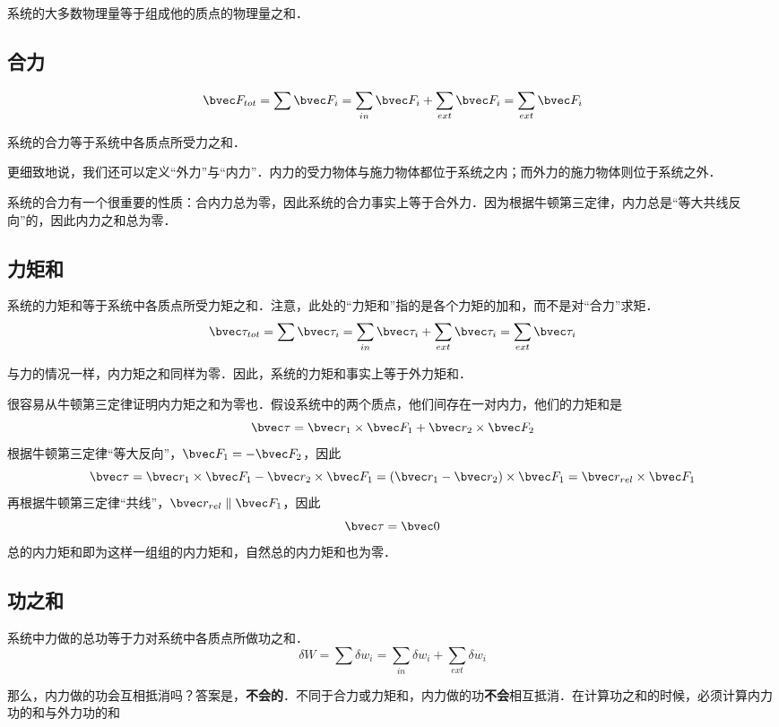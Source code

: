 

系统的大多数物理量等于组成他的质点的物理量之和．
\subsection{合力}
\begin{equation}
\bvec F_{tot}=\sum \bvec F_i=\sum_{in} \bvec F_i + \sum_{ext} \bvec F_i = \sum_{ext} \bvec F_i
\end{equation}

系统的合力等于系统中各质点所受力之和．

更细致地说，我们还可以定义“外力”与“内力”．内力的受力物体与施力物体都位于系统之内；而外力的施力物体则位于系统之外．

系统的合力有一个很重要的性质：合内力总为零，因此系统的合力事实上等于合外力．因为根据牛顿第三定律，内力总是“等大共线反向”的，因此内力之和总为零．

\subsection{力矩和}
系统的力矩和等于系统中各质点所受力矩之和．注意，此处的“力矩和”指的是各个力矩的加和，而不是对“合力”求矩．
\begin{equation}
\bvec \tau_{tot}=\sum \bvec \tau_i=\sum_{in} \bvec \tau_i + \sum_{ext} \bvec \tau_i = \sum_{ext} \bvec \tau_i
\end{equation}

与力的情况一样，内力矩之和同样为零．因此，系统的力矩和事实上等于外力矩和．

很容易从牛顿第三定律证明内力矩之和为零也．假设系统中的两个质点，他们间存在一对内力，他们的力矩和是
$$\bvec \tau = \bvec r_1 \times \bvec F_1 + \bvec r_2 \times \bvec F_2$$
根据牛顿第三定律“等大反向”，$\bvec F_1=-\bvec F_2$，因此
$$\bvec \tau = \bvec r_1 \times \bvec F_1 - \bvec r_2 \times \bvec F_1 = (\bvec r_1 - \bvec r_2) \times \bvec F_1 = \bvec r_{rel}\times \bvec F_1$$
再根据牛顿第三定律“共线”，$\bvec r_{rel} \parallel \bvec F_1 $，因此
$$\bvec \tau = \bvec 0$$
总的内力矩和即为这样一组组的内力矩和，自然总的内力矩和也为零．

\subsection{功之和}
系统中力做的总功等于力对系统中各质点所做功之和．
\begin{equation}
\delta W = \sum \delta w_i = \sum_{in} \delta w_i + \sum_{ext} \delta w_i
\end{equation}

那么，内力做的功会互相抵消吗？答案是，\textbf{不会的}．不同于合力或力矩和，内力做的功\textbf{不会}相互抵消．在计算功之和的时候，必须计算内力功的和与外力功的和
